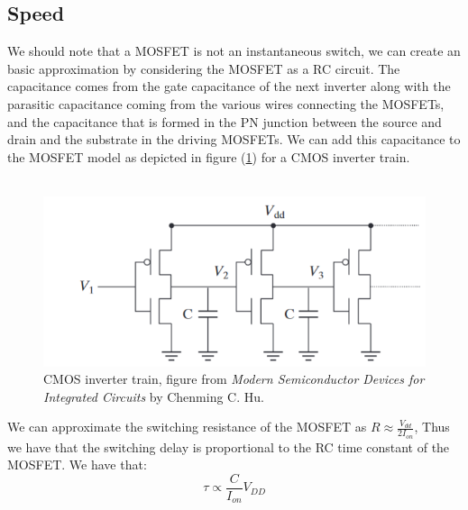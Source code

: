 \documentclass[
  reprint,
  amsmath,amssymb,
  aps
]{revtex4-1}
\begin{document}
\subsection{\label{sec:leve2}Speed}
We should note that a MOSFET is not an instantaneous switch, we can create an basic approximation by 
considering the MOSFET as a RC circuit. The capacitance comes from the gate capacitance of the next inverter
along with the parasitic capacitance coming from the various wires connecting the MOSFETs, and the capacitance that is formed in the 
PN junction between the source and drain and the substrate in the driving MOSFETs. We can add this capacitance to the MOSFET model as depicted in figure (\ref{fig:cmos_train}) for a 
CMOS inverter train.\\\\
\begin{figure}[H]
    \centering
    \includegraphics[width=0.75\linewidth]{cmos_inverter_train.png}
    \caption{CMOS inverter train, figure from \textit{Modern Semiconductor Devices for Integrated Circuits} by Chenming C. Hu. \cite{ChenmingHu6}}
    \label{fig:cmos_train}
\end{figure}
We can approximate the switching resistance of the MOSFET as $R\approx \frac{V_{dd}}{2I_{on}}$, Thus we have that 
the switching delay is proportional to the RC time constant of the MOSFET. We have that:
\begin{equation}
  \tau \propto \frac{C}{I_{on}}V_{DD}
\end{equation}
\end{document}
